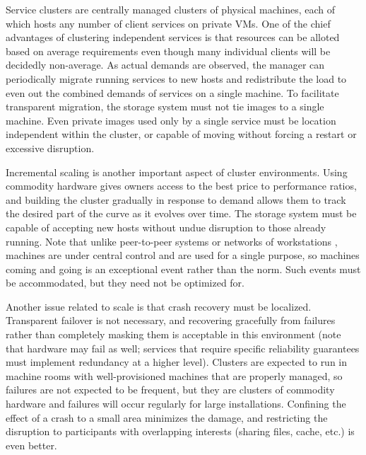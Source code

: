 Service clusters are centrally managed clusters of physical machines, each of which hosts any number of client services on private VMs. One of the chief advantages of clustering independent services is that resources can be alloted based on average requirements even though many individual clients will be decidedly non-average. As actual demands are observed, the manager can periodically migrate running services to new hosts and redistribute the load to even out the combined demands of services on a single machine. To facilitate transparent migration, the storage system must not tie images to a single machine. Even private images used only by a single service must be location independent within the cluster, or capable of moving without forcing a restart or excessive disruption.

Incremental scaling is another important aspect of cluster environments. Using commodity hardware gives owners access to the best price to performance ratios, and building the cluster gradually in response to demand allows them to track the desired part of the curve as it evolves over time. The storage system must be capable of accepting new hosts without undue disruption to those already running. Note that unlike peer-to-peer systems \cite{blake} or networks of workstations \cite{anderson95a}, machines are under central control and are used for a single purpose, so machines coming and going is an exceptional event rather than the norm. Such events must be accommodated, but they need not be optimized for.

Another issue related to scale is that crash recovery must be localized. Transparent failover is not necessary, and recovering gracefully from failures rather than completely masking them \cite{baker94} is acceptable in this environment (note that hardware may fail as well; services that require specific reliability guarantees must implement redundancy at a higher level). Clusters are expected to run in machine rooms with well-provisioned machines that are properly managed, so failures are not expected to be frequent, but they are clusters of commodity hardware and failures will occur regularly for large installations. Confining the effect of a crash to a small area minimizes the damage, and restricting the disruption to participants with overlapping interests (sharing files, cache, etc.) is even better.

